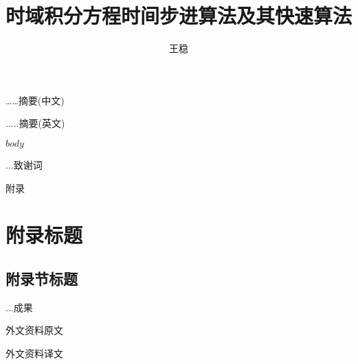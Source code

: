 \documentclass[master]{thesis-uestc}
\title{时域积分方程时间步进算法及其快速算法}{The Time Marching Scheme of Time Domain Integral Equation and Corresponding Fast Algorithm}
\author{王稳}{Wang Wen}                       %
\begin{document}
\makecover

\begin{chineseabstract}
……摘要(中文)

\end{chineseabstract}

\begin{englishabstract}
.....摘要(英文)

\end{englishabstract}

\thesistableofcontents

$body$

\thesisacknowledgement
...致谢词

\thesisappendix
附录

\chapter{附录标题}  %

\section{附录节标题}  %

\nocite{*}

% 
% 

...成果

\thesistranslationoriginal
外文资料原文

\thesistranslationchinese
外文资料译文
\end{document}
